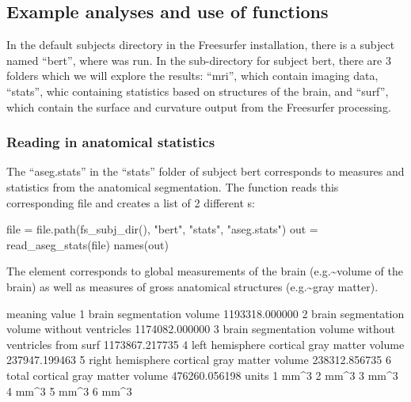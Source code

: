 \subsection{Example analyses and use of
functions}\label{example-analyses-and-use-of-functions}

In the default subjects directory in the Freesurfer installation, there
is a subject named ``bert'', where  was run. In the
sub-directory for subject bert, there are 3 folders which we will
explore the results: ``mri'', which contain imaging data, ``stats'',
whic containing statistics based on structures of the brain, and
``surf'', which contain the surface and curvature output from the
Freesurfer processing.

\subsubsection{Reading in anatomical
statistics}\label{reading-in-anatomical-statistics}

The ``aseg.stats'' in the ``stats'' folder of subject bert corresponds
to measures and statistics from the anatomical segmentation. The
 function reads this corresponding file and
creates a list of 2 different s:

\begin{Schunk}
\begin{Sinput}
file = file.path(fs_subj_dir(), "bert", "stats", "aseg.stats")
out = read_aseg_stats(file)
names(out)
\end{Sinput}
\end{Schunk}

The  element corresponds to global measurements of the
brain (e.g.\textasciitilde{}volume of the brain) as well as measures of
gross anatomical structures (e.g.\textasciitilde{}gray matter).

\begin{Schunk}
\begin{Soutput}
                                                 meaning          value
1                              brain segmentation volume 1193318.000000
2           brain segmentation volume without ventricles 1174082.000000
3 brain segmentation volume without ventricles from surf 1173867.217735
4            left hemisphere cortical gray matter volume  237947.199463
5           right hemisphere cortical gray matter volume  238312.856735
6                      total cortical gray matter volume  476260.056198
  units
1  mm^3
2  mm^3
3  mm^3
4  mm^3
5  mm^3
6  mm^3
\end{Soutput}
\end{Schunk}

